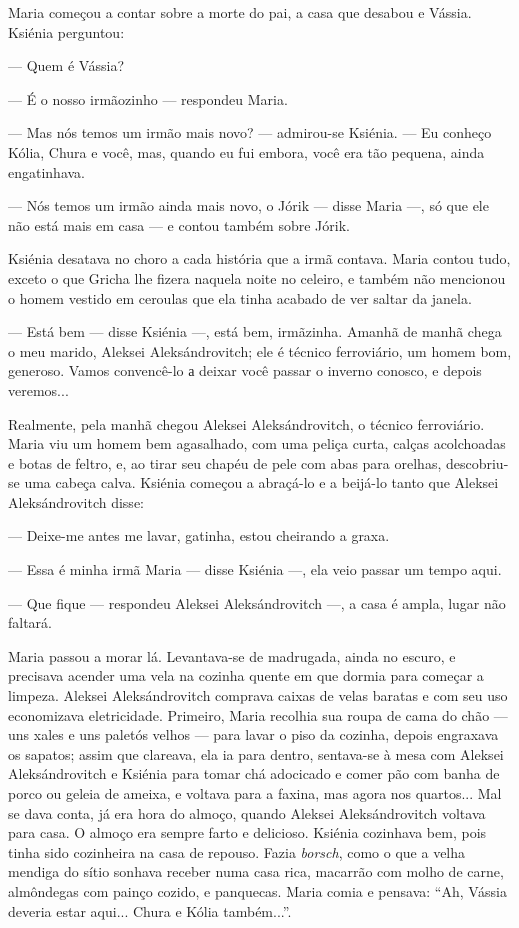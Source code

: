 Maria começou a contar sobre a morte do pai, a casa que desabou e
Vássia. Ksiénia perguntou:

--- Quem é Vássia?

--- É o nosso irmãozinho --- respondeu Maria.

--- Mas nós temos um irmão mais novo? --- admirou-se Ksiénia. --- Eu
conheço Kólia, Chura e você, mas, quando eu fui embora, você era tão
pequena, ainda engatinhava.

--- Nós temos um irmão ainda mais novo, o Jórik --- disse Maria ---, só
que ele não está mais em casa --- e contou também sobre Jórik.

Ksiénia desatava no choro a cada história que a irmã contava. Maria
contou tudo, exceto o que Gricha lhe fizera naquela noite no celeiro, e
também não mencionou o homem vestido em ceroulas que ela tinha acabado
de ver saltar da janela.

--- Está bem --- disse Ksiénia ---, está bem, irmãzinha. Amanhã de manhã
chega o meu marido, Aleksei Aleksándrovitch; ele é técnico ferroviário,
um homem bom, generoso. Vamos convencê-lo а deixar você passar o inverno
conosco, e depois veremos...

Realmente, pela manhã chegou Aleksei Aleksándrovitch, o técnico
ferroviário. Maria viu um homem bem agasalhado, com uma peliça curta,
calças acolchoadas e botas de feltro, e, ao tirar seu chapéu de pele com
abas para orelhas, descobriu-se uma cabeça calva. Ksiénia começou a
abraçá-lo e a beijá-lo tanto que Aleksei Aleksándrovitch disse:

--- Deixe-me antes me lavar, gatinha, estou cheirando a graxa.

--- Essa é minha irmã Maria --- disse Ksiénia ---, ela veio passar um
tempo aqui.

--- Que fique --- respondeu Aleksei Aleksándrovitch ---, a casa é ampla,
lugar não faltará.

Maria passou a morar lá. Levantava-se de madrugada, ainda no escuro, e
precisava acender uma vela na cozinha quente em que dormia para começar
a limpeza. Aleksei Aleksándrovitch comprava caixas de velas baratas e
com seu uso economizava eletricidade. Primeiro, Maria recolhia sua roupa
de cama do chão --- uns xales e uns paletós velhos --- para lavar o piso
da cozinha, depois engraxava os sapatos; assim que clareava, ela ia para
dentro, sentava-se à mesa com Aleksei Aleksándrovitch e Ksiénia para
tomar chá adocicado e comer pão com banha de porco ou geleia de ameixa,
e voltava para a faxina, mas agora nos quartos... Mal se dava conta, já
era hora do almoço, quando Aleksei Aleksándrovitch voltava para casa. O
almoço era sempre farto e delicioso. Ksiénia cozinhava bem, pois tinha
sido cozinheira na casa de repouso. Fazia \emph{borsch}, como o que a
velha mendiga do sítio sonhava receber numa casa rica, macarrão com
molho de carne, almôndegas com painço cozido, e panquecas. Maria comia e
pensava: ``Ah, Vássia deveria estar aqui... Chura e Kólia também...''.

